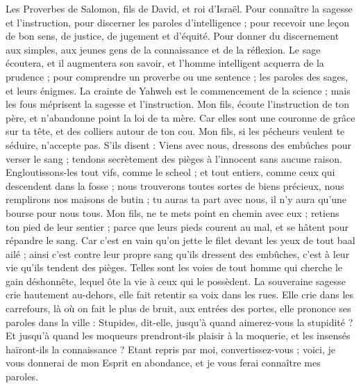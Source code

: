 \begin{multicols}{2}
\VerseOne{}Les Proverbes de Salomon, fils de David, et roi d'Israël.
Pour connaître la sagesse et l'instruction, pour discerner les paroles d'intelligence ;
pour recevoir une leçon de bon sens, de justice, de jugement et d'équité.
Pour donner du discernement aux simples, aux jeunes gens de la connaissance et de la réflexion.
Le sage écoutera, et il augmentera son savoir, et l'homme intelligent acquerra de la prudence ;
pour comprendre un proverbe ou une sentence ; les paroles des sages, et leurs énigmes.
La crainte de Yahweh est le commencement de la science ; mais les fous méprisent la sagesse et l'instruction.
Mon fils, écoute l'instruction de ton père, et n'abandonne point la loi de ta mère.
Car elles sont une couronne de grâce sur ta tête, et des colliers autour de ton cou.
Mon fils, si les pécheurs veulent te séduire, n’accepte pas.
S'ils disent : Viens avec nous, dressons des embûches pour verser le sang ; tendons secrètement des pièges à l’innocent sans aucune raison.
Engloutissons-les tout vifs, comme le scheol ; et tout entiers, comme ceux qui descendent dans la fosse ;
nous trouverons toutes sortes de biens précieux, nous remplirons nos maisons de butin ;
tu auras ta part avec nous, il n'y aura qu'une bourse pour nous tous.
Mon fils, ne te mets point en chemin avec eux ; retiens ton pied de leur sentier ;
parce que leurs pieds courent au mal, et se hâtent pour répandre le sang.
Car c’est en vain qu’on jette le filet devant les yeux de tout baal ailé ;
ainsi c’est contre leur propre sang qu’ils dressent des embûches, c’est à leur vie qu’ils tendent des pièges.
Telles sont les voies de tout homme qui cherche le gain déshonnête, lequel ôte la vie à ceux qui le possèdent.
La souveraine sagesse crie hautement au-dehors, elle fait retentir sa voix dans les rues.
Elle crie dans les carrefours, là où on fait le plus de bruit, aux entrées des portes, elle prononce ses paroles dans la ville :
Stupides, dit-elle, jusqu'à quand aimerez-vous la stupidité ? Et jusqu'à quand les moqueurs prendront-ils plaisir à la moquerie, et les insensés haïront-ils la connaissance ?
Etant repris par moi, convertissez-vous ; voici, je vous donnerai de mon Esprit en abondance, et je vous ferai connaître mes paroles.

\end{multicols}

